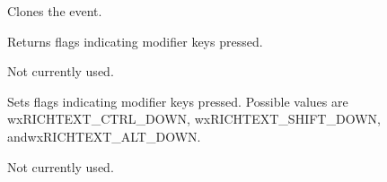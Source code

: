 
Clones the event.

\label{wxrichtexteventgetflags}


Returns flags indicating modifier keys pressed.

\label{wxrichtexteventgetindex}


Not currently used.

\label{wxrichtexteventsetflags}


Sets flags indicating modifier keys pressed. Possible values are wxRICHTEXT\_CTRL\_DOWN,
wxRICHTEXT\_SHIFT\_DOWN, andwxRICHTEXT\_ALT\_DOWN.

\label{wxrichtexteventsetindex}


Not currently used.


